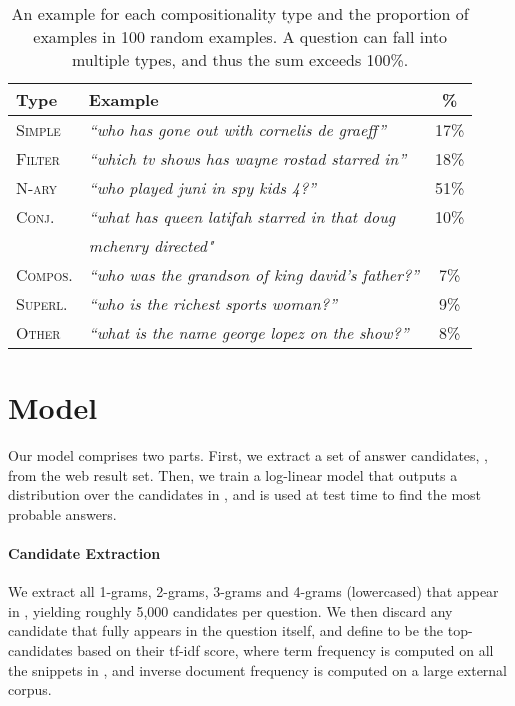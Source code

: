 \documentclass[11pt,a4paper]{article}
\newcommand\nl[1]{{\it``#1''}}
\begin{document}
\begin{table}[t]
\begin{center}
\scriptsize{
\begin{tabular}{l|l|c}
 \toprule
 \textbf{Type} & \textbf{Example} & \% \\ 
 \midrule
\textsc{Simple}      & \nl{who has gone out with cornelis de graeff} & 17\%  \\ 
\textsc{Filter}          & \nl{which tv shows has wayne rostad starred in}  &  18\% \\ 
\textsc{N-ary}          &  \nl{who played juni in spy kids 4?} & 51\%  \\ 
\textsc{Conj.}          & \emph{``what has queen latifah starred in that doug}  & 10\%  \\ 
   & \emph{mchenry directed"}  &  \\ 
\textsc{Compos.}          & \nl{who was the grandson of king david's father?} &  7\% \\
\textsc{Superl.}          &  \nl{who is the richest sports woman?} &  9\% \\ 
\textsc{Other}          &  \nl{what is the name george lopez on the show?} &  8\% \\ 
\toprule
\end{tabular}}
\end{center}
\caption{An example for each compositionality type and the proportion of examples in 100 random examples. A question can fall into multiple types, and thus the sum exceeds 100\%.}
\label{tab:compositionality}
\end{table}
 \section{Model}
Our model comprises two parts. First, we extract a set of answer candidates, , from the web result set. Then, we train a log-linear model that outputs a distribution over the candidates in , and is used at test time to find the most probable answers.

\paragraph{Candidate Extraction}
We extract all 1-grams, 2-grams, 3-grams and 4-grams (lowercased) that appear in , yielding roughly 5,000 candidates per question. We then discard any candidate that fully appears in the question itself, and define  to be  the top- candidates based on their tf-idf score, where term frequency is computed on all the snippets in , and inverse document frequency is computed on a large external corpus.
\end{document}
